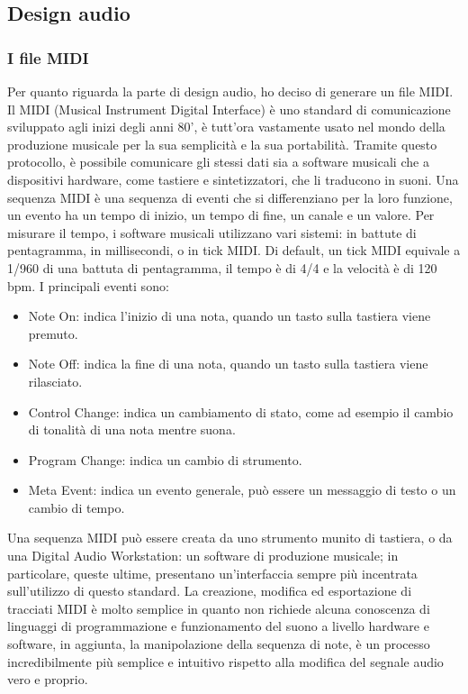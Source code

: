 \subsection{Design audio}
\subsubsection{I file MIDI}
Per quanto riguarda la parte di design audio, ho deciso di generare un file MIDI.
Il MIDI (Musical Instrument Digital Interface) è uno standard di comunicazione sviluppato agli inizi degli anni 80', è tutt'ora vastamente usato nel mondo della produzione musicale per la sua semplicità e la sua portabilità.
Tramite questo protocollo, è possibile comunicare gli stessi dati sia a software musicali che a dispositivi hardware, come tastiere e sintetizzatori, che li traducono in suoni.
Una sequenza MIDI è una sequenza di eventi che si differenziano per la loro funzione, un evento ha un tempo di inizio, un tempo di fine, un canale e un valore.
Per misurare il tempo, i software musicali utilizzano vari sistemi: in battute di pentagramma, in millisecondi, o in tick MIDI.
Di default, un tick MIDI equivale a 1/960 di una battuta di pentagramma, il tempo è di 4/4 e la velocità è di 120 bpm.
I principali eventi sono:
\begin{itemize}
    \item Note On: indica l'inizio di una nota, quando un tasto sulla tastiera viene premuto.
    \item Note Off: indica la fine di una nota, quando un tasto sulla tastiera viene rilasciato.
    \item Control Change: indica un cambiamento di stato, come ad esempio il cambio di tonalità di una nota mentre suona.
    \item Program Change: indica un cambio di strumento.
    \item Meta Event: indica un evento generale, può essere un messaggio di testo o un cambio di tempo.
\end{itemize}
Una sequenza MIDI può essere creata da uno strumento munito di tastiera, o da una Digital Audio Workstation: un software di produzione musicale; in particolare, queste ultime, presentano un'interfaccia sempre più incentrata sull'utilizzo di questo standard.
La creazione, modifica ed esportazione di tracciati MIDI è molto semplice in quanto non richiede alcuna conoscenza di linguaggi di programmazione e funzionamento del suono a livello hardware e software,
in aggiunta, la manipolazione della sequenza di note, è un processo incredibilmente più semplice e intuitivo rispetto alla modifica del segnale audio vero e proprio.
